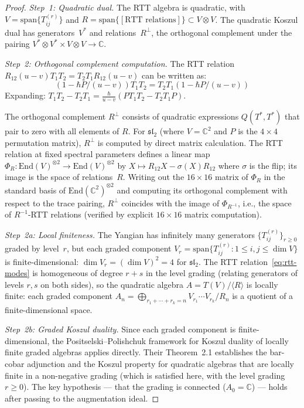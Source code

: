 \begin{proof}
\emph{Step~1: Quadratic dual.}
The RTT algebra is quadratic, with
$V = \mathrm{span}\{T_{ij}^{(r)}\}$ and
$R = \mathrm{span}\{[\text{RTT relations}]\}
\subset V \otimes V$.
The quadratic Koszul dual has generators~$V^*$
and relations~$R^\perp$, the orthogonal complement
under the pairing
$V^* \otimes V^* \times V \otimes V \to \mathbb{C}$.

\emph{Step~2: Orthogonal complement computation.}
The RTT relation $R_{12}(u-v) T_1 T_2 = T_2 T_1 R_{12}(u-v)$ can be written as:
\[
(1 - \hbar P/(u-v)) T_1 T_2 = T_2 T_1 (1 - \hbar P/(u-v))
\]
Expanding: $T_1 T_2 - T_2 T_1 = \frac{\hbar}{u-v}(P T_1 T_2 - T_2 T_1 P)$.

The orthogonal complement $R^\perp$ consists of quadratic expressions $Q(T^*, T^*)$ that pair to zero with all elements of $R$.  For $\mathfrak{sl}_2$ (where $V = \mathbb{C}^2$ and $P$ is the $4 \times 4$ permutation matrix), $R^\perp$ is computed by direct matrix calculation.  The RTT relation at fixed spectral parameters defines a linear map $\Phi_R\colon \mathrm{End}(V)^{\otimes 2} \to \mathrm{End}(V)^{\otimes 2}$ by $X \mapsto R_{12} X - \sigma(X) R_{12}$ where $\sigma$ is the flip; its image is the space of relations~$R$.  Writing out the $16 \times 16$ matrix of $\Phi_R$ in the standard basis of $\mathrm{End}(\mathbb{C}^2)^{\otimes 2}$ and computing its orthogonal complement with respect to the trace pairing, $R^\perp$ coincides with the image of $\Phi_{R^{-1}}$, i.e., the space of $R^{-1}$-RTT relations (verified by explicit $16\times 16$ matrix computation).

\emph{Step~2a: Local finiteness.}
The Yangian has infinitely many generators $\{T_{ij}^{(r)}\}_{r \geq 0}$ graded by level~$r$, but each graded component $V_r = \mathrm{span}\{T_{ij}^{(r)} : 1 \leq i,j \leq \dim V\}$ is finite-dimensional: $\dim V_r = (\dim V)^2 = 4$ for $\mathfrak{sl}_2$.  The RTT relation~\eqref{eq:rtt-modes} is homogeneous of degree $r + s$ in the level grading (relating generators of levels $r, s$ on both sides), so the quadratic algebra $A = T(V)/\langle R \rangle$ is locally finite: each graded component $A_n = \bigoplus_{r_1 + \cdots + r_k = n} V_{r_1} \cdots V_{r_k} / R_n$ is a quotient of a finite-dimensional space.

\emph{Step~2b: Graded Koszul duality.}
Since each graded component is finite-dimensional, the Positselski--Polishchuk framework \cite{PP05} for Koszul duality of locally finite graded algebras applies directly.  Their Theorem~2.1 establishes the bar-cobar adjunction and the Koszul property for quadratic algebras that are locally finite in a non-negative grading (which is satisfied here, with the level grading $r \geq 0$).  The key hypothesis --- that the grading is connected ($A_0 = \mathbb{C}$) --- holds after passing to the augmentation ideal.


\end{proof}
